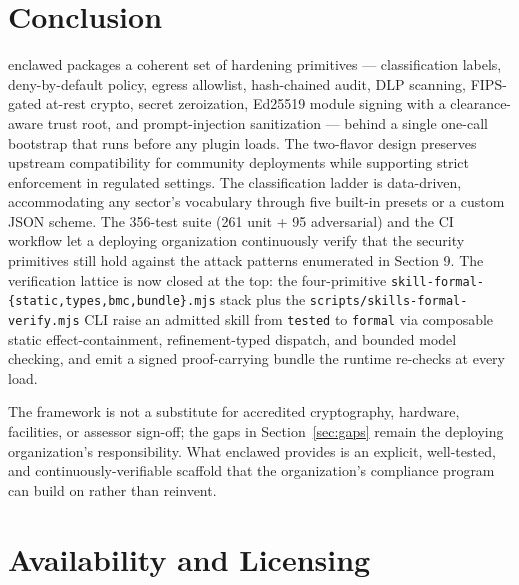 \documentclass[11pt]{article}
\begin{document}
\section{Conclusion}

enclawed packages a coherent set of hardening primitives ---
classification labels, deny-by-default policy, egress allowlist,
hash-chained audit, DLP scanning, FIPS-gated at-rest crypto, secret
zeroization, Ed25519 module signing with a clearance-aware trust root,
and prompt-injection sanitization --- behind a single one-call bootstrap
that runs before any plugin loads. The two-flavor design preserves
upstream compatibility for community deployments while supporting strict
enforcement in regulated settings. The classification ladder is
data-driven, accommodating any sector's vocabulary through five
built-in presets or a custom JSON scheme. The 356-test suite (261 unit +
95 adversarial) and the CI workflow let a deploying organization
continuously verify that the security primitives still hold against the
attack patterns enumerated in Section 9. The verification lattice is
now closed at the top: the four-primitive
\texttt{skill-formal-\{static,types,bmc,bundle\}.mjs} stack plus the
\texttt{scripts/skills-formal-verify.mjs} CLI raise an admitted skill
from \texttt{tested} to \texttt{formal} via composable static
effect-containment, refinement-typed dispatch, and bounded model
checking, and emit a signed proof-carrying bundle the runtime
re-checks at every load.

The framework is not a substitute for accredited cryptography, hardware,
facilities, or assessor sign-off; the gaps in Section~\ref{sec:gaps}
remain the deploying organization's responsibility. What enclawed
provides is an explicit, well-tested, and continuously-verifiable
scaffold that the organization's compliance program can build on rather
than reinvent.

\section*{Availability and Licensing}
\end{document}
